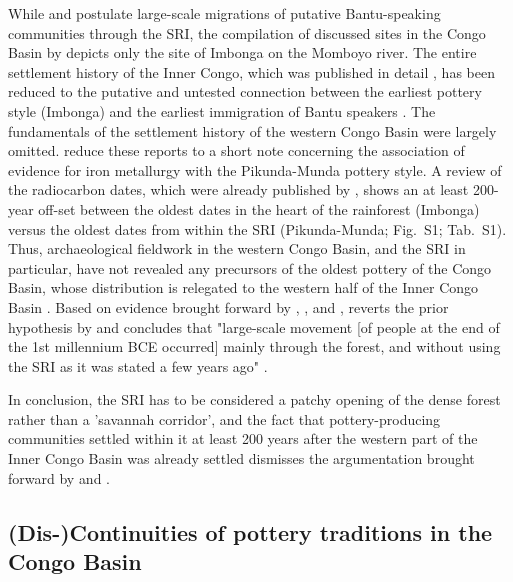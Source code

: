 \documentclass[smallextended,natbib]{svjour3}       %
\begin{document}
While \citet{Grollemund.2015} and \citet{Bostoen.2015} postulate large-scale migrations of putative Bantu-speaking communities through the SRI, the compilation of discussed sites in the Congo Basin by \citet[356 Fig.~1]{Bostoen.2015} depicts only the site of Imbonga on the Momboyo river. The entire settlement history of the Inner Congo, which was published in detail \citep{Eggert.1984,Eggert.1987a,Wotzka.1995}, has been reduced to the putative and untested connection between the earliest pottery style (Imbonga) and the earliest immigration of Bantu speakers \citep[366]{Bostoen.2015}. The fundamentals of the settlement history of the western Congo Basin \citep{Eggert.1992,Eggert.1993} were largely omitted. \citet[364]{Bostoen.2015} reduce these reports to a short note concerning the association of evidence for iron metallurgy with the Pikunda-Munda pottery style. A review of the radiocarbon dates, which were already published by \citet{Eggert.1992,Eggert.1993}, shows an at least 200-year off-set between the oldest dates in the heart of the rainforest (Imbonga) versus the oldest dates from within the SRI (Pikunda-Munda; Fig.~S1; Tab.~S1). Thus, archaeological fieldwork in the western Congo Basin, and the SRI in particular, have not revealed any precursors of the oldest pottery of the Congo Basin, whose distribution is relegated to the western half of the Inner Congo Basin \citep[220 Fig.~100A]{Seidensticker.2021e}. Based on evidence brought forward by \citet{MorinRivat.2014}, \citet{Seidensticker.2016b}, and \citet{Giresse.2020}, \citet{Clist.2022} reverts the prior hypothesis by \citet{Bostoen.2015} and concludes that "large-scale movement [of people at the end of the 1st millennium BCE occurred] mainly through the forest, and without using the SRI as it was stated a few years ago" \citep[67]{Clist.2022}. 

In conclusion, the SRI has to be considered a patchy opening of the dense forest rather than a 'savannah corridor', and the fact that pottery-producing communities settled within it at least 200 years after the western part of the Inner Congo Basin was already settled dismisses the argumentation brought forward by \citet{Grollemund.2015,Grollemund.2023} and \citet{Bostoen.2015}.

\subsection*{(Dis-)Continuities of pottery traditions in the Congo Basin}
\end{document}
